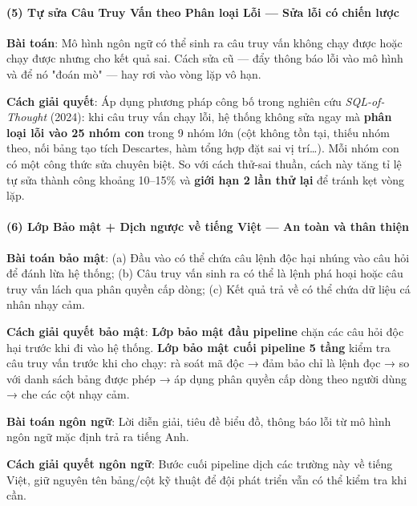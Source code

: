 \documentclass[11pt,a4paper]{article}
\begin{document}
\paragraph{(5) Tự sửa Câu Truy Vấn theo Phân loại Lỗi --- Sửa lỗi có chiến lược}

\begin{tcolorbox}[notebox]
\textbf{Bài toán}: Mô hình ngôn ngữ có thể sinh ra câu truy vấn không chạy được hoặc chạy được nhưng cho kết quả sai. Cách sửa cũ --- đẩy thông báo lỗi vào mô hình và để nó "đoán mò" --- hay rơi vào vòng lặp vô hạn.

\textbf{Cách giải quyết}: Áp dụng phương pháp công bố trong nghiên cứu \textit{SQL-of-Thought} (2024): khi câu truy vấn chạy lỗi, hệ thống không sửa ngay mà \textbf{phân loại lỗi vào 25 nhóm con} trong 9 nhóm lớn (cột không tồn tại, thiếu nhóm theo, nối bảng tạo tích Descartes, hàm tổng hợp đặt sai vị trí\ldots). Mỗi nhóm con có một công thức sửa chuyên biệt. So với cách thử-sai thuần, cách này tăng tỉ lệ tự sửa thành công khoảng 10--15\% và \textbf{giới hạn 2 lần thử lại} để tránh kẹt vòng lặp.
\end{tcolorbox}

\paragraph{(6) Lớp Bảo mật + Dịch ngược về tiếng Việt --- An toàn và thân thiện}

\begin{tcolorbox}[notebox]
\textbf{Bài toán bảo mật}: (a) Đầu vào có thể chứa câu lệnh độc hại nhúng vào câu hỏi để đánh lừa hệ thống; (b) Câu truy vấn sinh ra có thể là lệnh phá hoại hoặc câu truy vấn lách qua phân quyền cấp dòng; (c) Kết quả trả về có thể chứa dữ liệu cá nhân nhạy cảm.

\textbf{Cách giải quyết bảo mật}: \textbf{Lớp bảo mật đầu pipeline} chặn các câu hỏi độc hại trước khi đi vào hệ thống. \textbf{Lớp bảo mật cuối pipeline 5 tầng} kiểm tra câu truy vấn trước khi cho chạy: rà soát mã độc → đảm bảo chỉ là lệnh đọc → so với danh sách bảng được phép → áp dụng phân quyền cấp dòng theo người dùng → che các cột nhạy cảm.

\textbf{Bài toán ngôn ngữ}: Lời diễn giải, tiêu đề biểu đồ, thông báo lỗi từ mô hình ngôn ngữ mặc định trả ra tiếng Anh.

\textbf{Cách giải quyết ngôn ngữ}: Bước cuối pipeline dịch các trường này về tiếng Việt, giữ nguyên tên bảng/cột kỹ thuật để đội phát triển vẫn có thể kiểm tra khi cần.
\end{tcolorbox}
\end{document}
